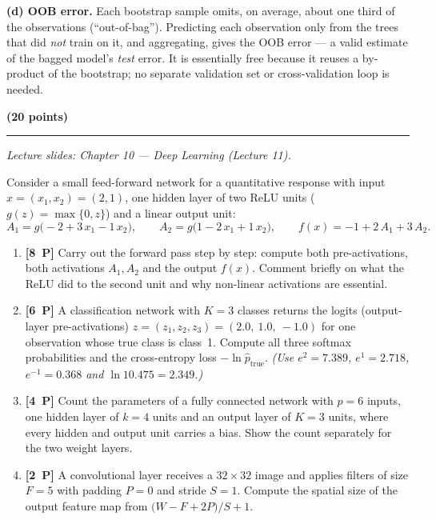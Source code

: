 \documentclass[11pt,a4paper]{article}
\newcommand{\problem}[2]{\par\vspace{7mm}\noindent{\large\textbf{Problem #1}}%
  \hfill{\large\textbf{(#2 points)}}\par\nopagebreak\vspace{0.6mm}%
  \noindent\rule{\textwidth}{0.6pt}\par\nopagebreak\vspace{2.5mm}}
\newcommand{\pp}[1]{\textbf{[#1~P]}\enspace}
\begin{document}
\begin{solutionbox}
\medskip
\textbf{(d) OOB error.}
Each bootstrap sample omits, on average, about one third of the observations
(``out-of-bag''). Predicting each observation only from the trees that did \emph{not} train on
it, and aggregating, gives the OOB error --- a valid estimate of the bagged model's
\emph{test} error. It is essentially free because it reuses a by-product of the bootstrap; no
separate validation set or cross-validation loop is needed.
\end{solutionbox}
\fi

\problem{5: Neural networks by hand}{20}
{\small\itshape Lecture slides: Chapter 10 --- Deep Learning (Lecture 11).}\par\vspace{1mm}

Consider a small feed-forward network for a quantitative response with input
$x=(x_1,x_2)=(2,1)$, one hidden layer of two ReLU units ($g(z)=\max\{0,z\}$) and a linear
output unit:
\[
  A_1=g\bigl(-2+3\,x_1-1\,x_2\bigr),\qquad
  A_2=g\bigl(1-2\,x_1+1\,x_2\bigr),\qquad
  f(x)=-1+2\,A_1+3\,A_2 .
\]

\begin{enumerate}[label=(\alph*),leftmargin=7mm,itemsep=2.5mm]
  \item \pp{8} Carry out the forward pass step by step: compute both pre-activations, both
    activations $A_1,A_2$ and the output $f(x)$. Comment briefly on what the ReLU did to the
    second unit and why non-linear activations are essential.
  \item \pp{6} A classification network with $K=3$ classes returns the logits (output-layer
    pre-activations) $z=(z_1,z_2,z_3)=(2.0,\ 1.0,\ -1.0)$ for one observation whose true class
    is class~1. Compute all three softmax probabilities and the cross-entropy loss
    $-\ln\hat{p}_{\text{true}}$.
    \emph{(Use $e^{2}=7.389$, $e^{1}=2.718$, $e^{-1}=0.368$ and $\ln 10.475=2.349$.)}
  \item \pp{4} Count the parameters of a fully connected network with $p=6$ inputs, one hidden
    layer of $k=4$ units and an output layer of $K=3$ units, where every hidden and output unit
    carries a bias. Show the count separately for the two weight layers.
  \item \pp{2} A convolutional layer receives a $32\times 32$ image and applies filters of size
    $F=5$ with padding $P=0$ and stride $S=1$. Compute the spatial size of the output feature
    map from $\bigl(W-F+2P\bigr)/S+1$.
\end{enumerate}
\end{document}
